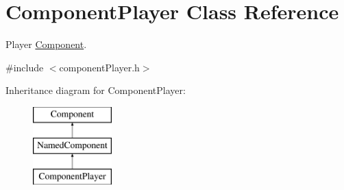 \hypertarget{classComponentPlayer}{
\section{\-Component\-Player \-Class \-Reference}
\label{d5/d28/classComponentPlayer}
}


\-Player \hyperlink{classComponent}{\-Component}.  




{\ttfamily \#include $<$component\-Player.\-h$>$}

\-Inheritance diagram for \-Component\-Player\-:\begin{figure}[H]
\begin{center}
\leavevmode
\includegraphics[height=3.000000cm]{d5/d28/classComponentPlayer}
\end{center}
\end{figure}
